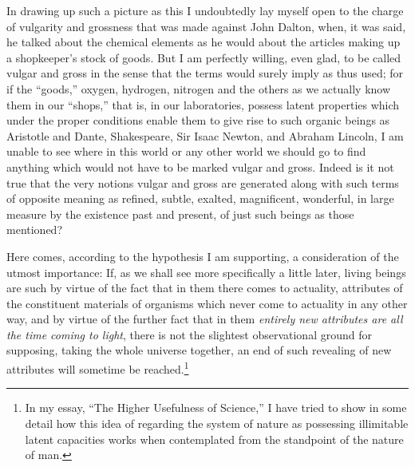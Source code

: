 \documentclass[a4paper, 11pt, oneside, polutonikogreek, english, landscape]{article}
\begin{document}
In drawing up such a picture as this I undoubtedly lay myself open to the charge of vulgarity and grossness that was made against John Dalton, when, it was said, he talked about the chemical elements as he would about the articles making up a shopkeeper's stock of goods. But I am perfectly willing, even glad, to be called vulgar and gross in the sense that the terms would surely imply as thus used; for if the ``goods,'' oxygen, hydrogen, nitrogen and the others as we actually know them in our ``shops,'' that is, in our laboratories, possess latent properties which under the proper conditions enable them to give rise to such organic beings as Aristotle and Dante, Shakespeare, Sir Isaac Newton, and Abraham Lincoln, I am unable to see where in this world or any other world we should go to find anything which would not have to be marked vulgar and gross. Indeed is it not true that the very notions vulgar and gross are generated along with such terms of opposite meaning as refined, subtle, exalted, magnificent, wonderful, in large measure by the existence past and present, of just such beings as those mentioned?

Here comes, according to the hypothesis I am supporting, a consideration of the utmost importance: If, as we shall see more specifically a little later, living beings are such by virtue of the fact that in them there comes to actuality, attributes of the constituent materials of organisms which never come to actuality in any other way, and by virtue of the further fact that in them \emph{entirely new attributes are all the time coming to light}, there is not the slightest observational ground for supposing, taking the whole universe together, an end of such revealing of new attributes will sometime be reached.\footnote{In my essay, ``The Higher Usefulness of Science,'' I have tried to show in some detail how this idea of regarding the system of nature as possessing illimitable latent capacities works when contemplated from the standpoint of the nature of man.} 
\end{document}
